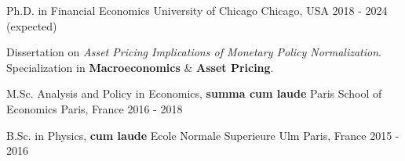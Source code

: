 

\begin{cventries}

	\cventry
	{Ph.D. in Financial Economics} %
	{University of Chicago} %
	{Chicago, USA} %
	{2018 - 2024 (expected)} %
	{\begin{cvitems}
			\item Dissertation on \textit{Asset Pricing Implications of Monetary Policy Normalization}. Specialization in \textbf{Macroeconomics} \& \textbf{Asset Pricing}.
		\end{cvitems}}

	\cventry
	{M.Sc. Analysis and Policy in Economics, \textbf{summa cum laude}} %
	{Paris School of Economics} %
	{Paris, France} %
	{2016 - 2018} %
	{}

	\cventry
	{B.Sc. in Physics, \textbf{cum laude}} %
	{Ecole Normale Superieure Ulm} %
	{Paris, France} %
	{2015 - 2016} %
	{}

\end{cventries}
